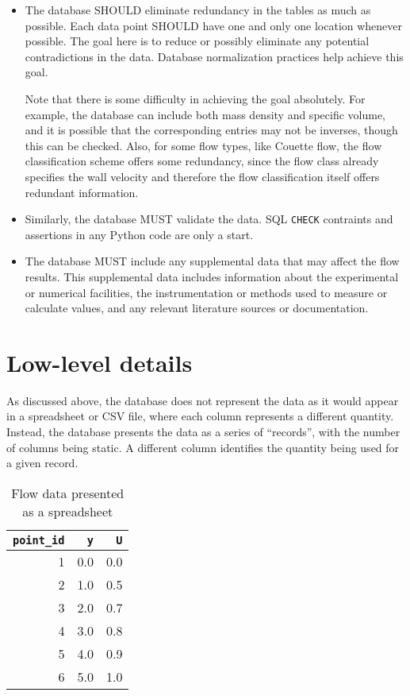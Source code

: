 \begin{itemize}
\begin{enumerate}
    \end{enumerate}

\item The database SHOULD eliminate redundancy in the tables as much as
possible.  Each data point SHOULD have one and only one location whenever
possible.  The goal here is to reduce or possibly eliminate any potential
contradictions in the data.  Database normalization practices help achieve this
goal.

Note that there is some difficulty in achieving the goal absolutely.  For
example, the database can include both mass density and specific volume, and it
is possible that the corresponding entries may not be inverses, though this can
be checked.  Also, for some flow types, like Couette flow, the flow
classification scheme offers some redundancy, since the flow class already
specifies the wall velocity and therefore the flow classification itself offers
redundant information.

\item Similarly, the database MUST validate the data.  SQL \texttt{CHECK}
contraints and assertions in any Python code are only a start.

\item The database MUST include any supplemental data that may affect the flow
results.  This supplemental data includes information about the experimental or
numerical facilities, the instrumentation or methods used to measure or
calculate values, and any relevant literature sources or documentation.

\end{itemize}


\section{Low-level details}

As discussed above, the database does not represent the data as it would appear
in a spreadsheet or CSV file, where each column represents a different
quantity.  Instead, the database presents the data as a series of ``records'',
with the number of columns being static.  A different column identifies the
quantity being used for a given record.

\begin{table}[p]
    \centering
    \begin{tabular}{ r | r r }
        \texttt{point\_id} & \texttt{y} & \texttt{U} \\
        \hline
                         1 &        0.0 &        0.0 \\
                         2 &        1.0 &        0.5 \\
                         3 &        2.0 &        0.7 \\
                         4 &        3.0 &        0.8 \\
                         5 &        4.0 &        0.9 \\
                         6 &        5.0 &        1.0
    \end{tabular}
    \caption{Flow data presented as a spreadsheet}
    \label{tab:flow-data-spreadsheet}
\end{table}

